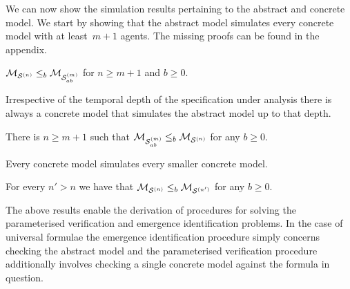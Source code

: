 We can now show the simulation results pertaining to the abstract and concrete
model.  We start by showing that the abstract model simulates every concrete
model with at least~$m+1$ agents. The missing proofs can be found in the
appendix.

\begin{theorem}
\label{th:ab-concr-sim}
$\mathcal{M}_{\mathcal{S}^{(n)}} \leq_b \mathcal{M}_{\mathcal{S}_{ab}^{(m)}}$ for $n \geq m+1$ and $b \geq 0$.
\end{theorem}

Irrespective of the temporal depth of the specification under
analysis there is always a concrete model that simulates the abstract model up
to that depth.

\begin{theorem}
\label{th:concr-ab-sim}
There is $n \geq m+1$ such that $\mathcal{M}_{\mathcal{S}_{ab}^{(m)}} \leq_b \mathcal{M}_{\mathcal{S}^{(n)}}$ for any $b \geq 0$.
\end{theorem}


Every concrete model simulates every smaller concrete model.

\begin{theorem}
\label{th:concr-sim}
For every $n' > n$ we have that $\mathcal{M}_{\mathcal{S}^{(n)}} \leq_b \mathcal{M}_{\mathcal{S}^{(n')}}$ for any
$b \geq 0$.
\end{theorem}

The above results enable the derivation of procedures for solving
the parameterised verification and emergence identification problems. In the case
of universal formulae the emergence identification procedure simply concerns
checking the abstract model and the parameterised verification procedure 
additionally involves checking a single concrete model against the formula in
question.

